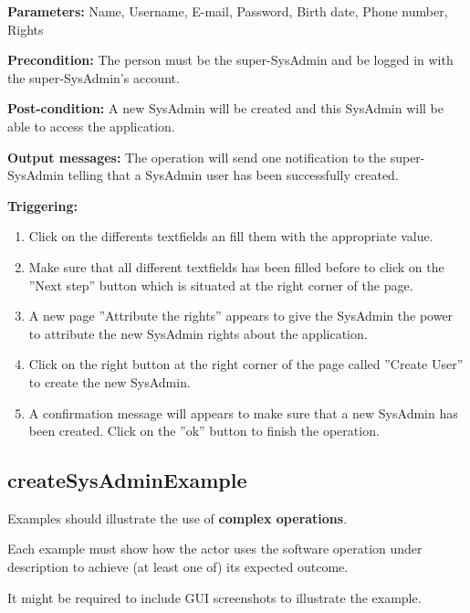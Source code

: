 \begin{description}

\item \textbf{Parameters:} Name, Username, E-mail, Password, Birth date, Phone
number, Rights
\item \textbf{Precondition:} The person must be the super-SysAdmin and be logged
in with the super-SysAdmin's account.
\item \textbf{Post-condition:} A new SysAdmin will be created and this
SysAdmin will be able to access the application.
\item \textbf{Output messages:} The operation will send one notification to the
super-SysAdmin telling that a SysAdmin user has been successfully created.


\item \textbf{Triggering:}
\begin{enumerate}
\item Click on the differents textfields an fill them with the appropriate
value.
\item Make sure that all different textfields has been filled before to
click on the ''Next step'' button which is situated at the right corner of the
page.
\item A new page ''Attribute the rights'' appears to give the SysAdmin the
power to attribute the new SysAdmin rights about the application.
\item Click on the right button at the right corner of the page called
''Create User'' to create the new SysAdmin.
\item A confirmation message will appears to make sure that a new SysAdmin
has been created. Click on the ''ok'' button to finish the operation.
\end{enumerate}

 
\end{description}

 
\subsection{createSysAdminExample}
Examples should illustrate the use of \textbf{complex operations}.

Each example must show how the actor uses the software operation under
description to achieve (at least one of) its expected outcome.

It might be required to include GUI screenshots to illustrate the example.








